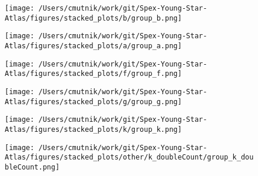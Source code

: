 \begin{figure}[h!]
\begin{center}
\texttt{[image: /Users/cmutnik/work/git/Spex-Young-Star-Atlas/figures/stacked\_plots/b/group\_b.png]}
\caption{ \protect}
\end{center}
\end{figure}


\begin{figure}[h!]
\begin{center}
\texttt{[image: /Users/cmutnik/work/git/Spex-Young-Star-Atlas/figures/stacked\_plots/a/group\_a.png]}
\caption{ \protect}
\end{center}
\end{figure}


\begin{figure}[h!]
\begin{center}
\texttt{[image: /Users/cmutnik/work/git/Spex-Young-Star-Atlas/figures/stacked\_plots/f/group\_f.png]}
\caption{ \protect}
\end{center}
\end{figure}


\begin{figure}[h!]
\begin{center}
\texttt{[image: /Users/cmutnik/work/git/Spex-Young-Star-Atlas/figures/stacked\_plots/g/group\_g.png]}
\caption{ \protect}
\end{center}
\end{figure}


\begin{figure}[h!]
\begin{center}
\texttt{[image: /Users/cmutnik/work/git/Spex-Young-Star-Atlas/figures/stacked\_plots/k/group\_k.png]}
\caption{ \protect}
\end{center}
\end{figure}


\begin{figure}[h!]
\begin{center}
\texttt{[image: /Users/cmutnik/work/git/Spex-Young-Star-Atlas/figures/stacked\_plots/other/k\_doubleCount/group\_k\_doubleCount.png]}
\caption{ \protect}
\end{center}
\end{figure}


